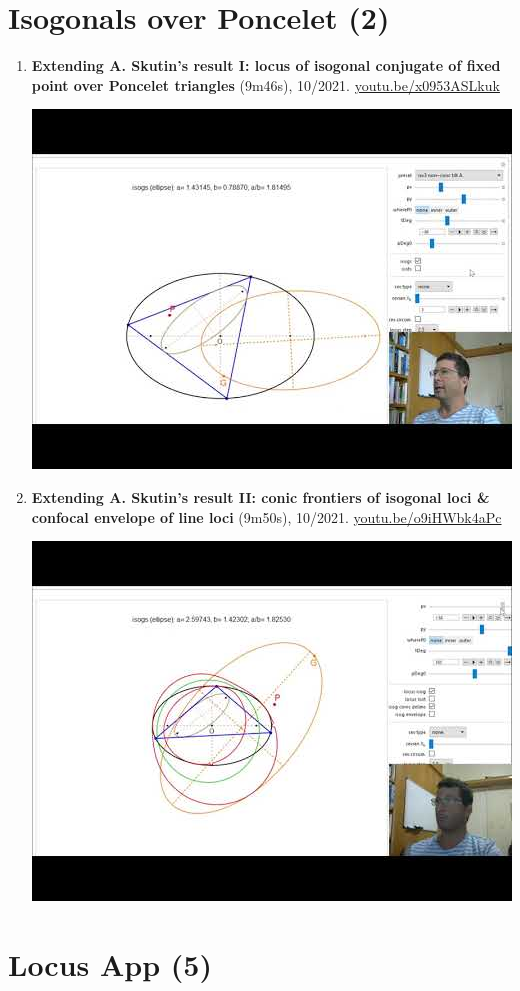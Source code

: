 \documentclass[12pt]{article}
\begin{document}
\section{Isogonals over Poncelet (2)}

\begin{enumerate}[resume]
\item \textbf{Extending A. Skutin's result I: locus of isogonal conjugate of fixed point over Poncelet triangles} (9m46s), 10/2021. \href{https://youtu.be/x0953ASLkuk}{\url{youtu.be/x0953ASLkuk}}
\begin{center}\includegraphics[width=.5\textwidth]{pics/x0953ASLkuk.jpg}\end{center}
% 
\item \textbf{Extending A. Skutin's result II: conic frontiers of isogonal loci \& confocal envelope of line loci} (9m50s), 10/2021. \href{https://youtu.be/o9iHWbk4aPc}{\url{youtu.be/o9iHWbk4aPc}}
\begin{center}\includegraphics[width=.5\textwidth]{pics/o9iHWbk4aPc.jpg}\end{center}
% 
\end{enumerate}

\section{Locus App (5)}
\end{document}
